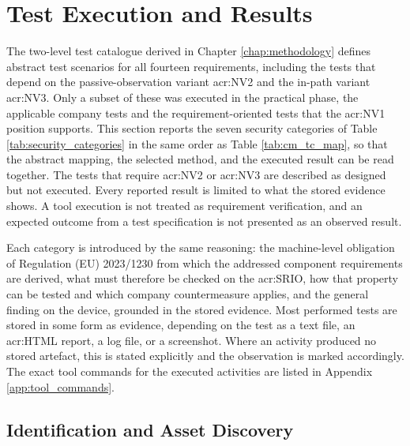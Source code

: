 \section{Test Execution and Results}
\label{sec:executed_tests} 
The two-level test catalogue derived in Chapter \ref{chap:methodology} defines abstract test scenarios for all fourteen requirements, including the tests that depend on the passive-observation variant \gls{acr:NV2} and the in-path variant \gls{acr:NV3}. Only a subset of these was executed in the practical phase, the applicable company tests and the requirement-oriented tests that the \gls{acr:NV1} position supports. This section reports the seven security categories of Table \ref{tab:security_categories} in the same order as Table \ref{tab:cm_tc_map}, so that the abstract mapping, the selected method, and the executed result can be read together. The tests that require \gls{acr:NV2} or \gls{acr:NV3} are described as designed but not executed. Every reported result is limited to what the stored evidence shows. A tool execution is not treated as requirement verification, and an expected outcome from a test specification is not presented as an observed result.

Each category is introduced by the same reasoning: the machine-level obligation of Regulation (EU) 2023/1230 from which the addressed component requirements are derived, what must therefore be checked on the \gls{acr:SRIO}, how that property can be tested and which company countermeasure applies, and the general finding on the device, grounded in the stored evidence. Most performed tests are stored in some form as evidence, depending on the test as a text file, an \gls{acr:HTML} report, a log file, or a screenshot. Where an activity produced no stored artefact, this is stated explicitly and the observation is marked accordingly. The exact tool commands for the executed activities are listed in Appendix \ref{app:tool_commands}.


\subsection{Identification and Asset Discovery}
\label{subsec:cat_identification}

